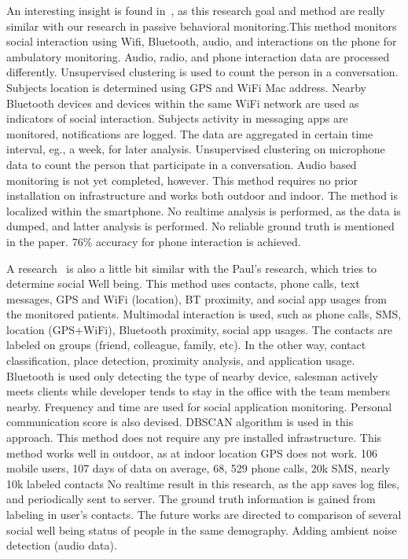 
An interesting insight is found in~\cite{thesis031}, as this research goal and method are really similar with our research in passive behavioral monitoring.This method monitors social interaction using Wifi, Bluetooth, audio, and interactions on the phone for ambulatory monitoring. Audio, radio, and phone interaction data are processed differently. Unsupervised clustering is used to count the person in a conversation. Subjects location is determined using GPS and WiFi Mac address. Nearby Bluetooth devices and devices within the same WiFi network are used as indicators of social interaction. Subjects activity in messaging apps are monitored, notifications are logged. The data are aggregated in certain time interval, eg., a week, for later analysis. Unsupervised clustering on microphone data to count the person that participate in a conversation. Audio based monitoring is not yet completed, however. This method requires no prior installation on infrastructure and works both outdoor and indoor. The method is localized within the smartphone. No realtime analysis is performed, as the data is dumped, and latter analysis is performed. No reliable ground truth is mentioned in the paper. 76\% accuracy for phone interaction is achieved.

A research~\cite{thesis030} is also a little bit similar with the Paul's research, which tries to determine social Well being. This method uses contacts, phone calls, text messages, GPS and WiFi (location), BT proximity, and social app usages from the monitored patients. Multimodal interaction is used, such as phone calls, SMS, location (GPS+WiFi), Bluetooth proximity, social app usages. The contacts are labeled on groups (friend, colleague, family, etc). In the other way, contact classification, place detection, proximity analysis, and application usage. Bluetooth is used only detecting the type of nearby device, salesman actively meets clients while developer tends to stay in the office with the team members nearby. Frequency and time are used for social application monitoring. Personal communication score is also devised. DBSCAN algorithm is used in this approach. This method does not require any pre installed infrastructure. This method works well in outdoor, as at indoor location GPS does not work. 106 mobile users, 107 days of data on average, 68, 529 phone calls, 20k SMS, nearly 10k labeled contacts No realtime result in this research, as the app saves log files, and periodically sent to server.
The ground truth information is gained from labeling in user's contacts.
The future works are directed to comparison of several social well being status of people in the same demography. Adding ambient noise detection (audio data).














